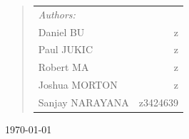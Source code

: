 \documentclass[12pt]{article}
\begin{document}
\begin{center}
\begin{quote}
\begin{table}[!htb]
\centering
\begin{tabular}{lr}             \large
\emph{Authors:} & \hspace{8.5cm} \\[0.2cm] \large
Daniel \textsc{BU}        &  z\\ \large
Paul \textsc{JUKIC}       &  z\\ \large
Robert \textsc{MA}        &  z\\ \large
Joshua \textsc{MORTON}    &  z\\ \large
Sanjay \textsc{NARAYANA}  & z3424639\\

\end{tabular}
\end{table}
\end{quote}

\vfill

{\large \today}
\end{center}

\pagebreak
\end{document}
